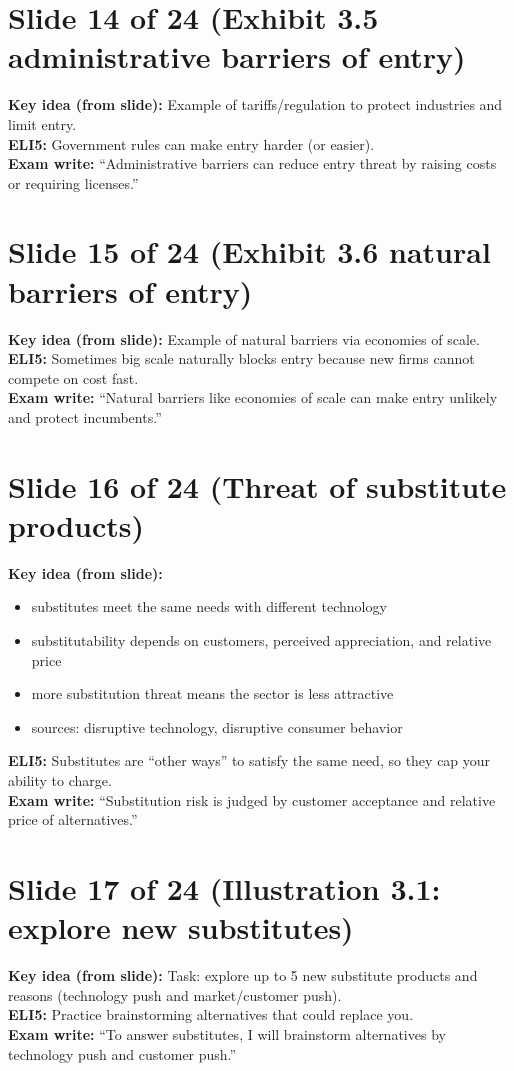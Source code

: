\documentclass[11pt,a4paper]{article}
\begin{document}
\section*{Slide 14 of 24 (Exhibit 3.5 administrative barriers of entry)}
\textbf{Key idea (from slide):} Example of tariffs/regulation to protect industries and limit entry.\\
\textbf{ELI5:} Government rules can make entry harder (or easier).\\
\textbf{Exam write:} ``Administrative barriers can reduce entry threat by raising costs or requiring licenses.''

\section*{Slide 15 of 24 (Exhibit 3.6 natural barriers of entry)}
\textbf{Key idea (from slide):} Example of natural barriers via economies of scale.\\
\textbf{ELI5:} Sometimes big scale naturally blocks entry because new firms cannot compete on cost fast.\\
\textbf{Exam write:} ``Natural barriers like economies of scale can make entry unlikely and protect incumbents.''

\section*{Slide 16 of 24 (Threat of substitute products)}
\textbf{Key idea (from slide):}
\begin{itemize}
  \item substitutes meet the same needs with different technology
  \item substitutability depends on customers, perceived appreciation, and relative price
  \item more substitution threat means the sector is less attractive
  \item sources: disruptive technology, disruptive consumer behavior
\end{itemize}
\textbf{ELI5:} Substitutes are ``other ways'' to satisfy the same need, so they cap your ability to charge.\\
\textbf{Exam write:} ``Substitution risk is judged by customer acceptance and relative price of alternatives.''

\section*{Slide 17 of 24 (Illustration 3.1: explore new substitutes)}
\textbf{Key idea (from slide):} Task: explore up to 5 new substitute products and reasons (technology push and market/customer push).\\
\textbf{ELI5:} Practice brainstorming alternatives that could replace you.\\
\textbf{Exam write:} ``To answer substitutes, I will brainstorm alternatives by technology push and customer push.''
\end{document}
